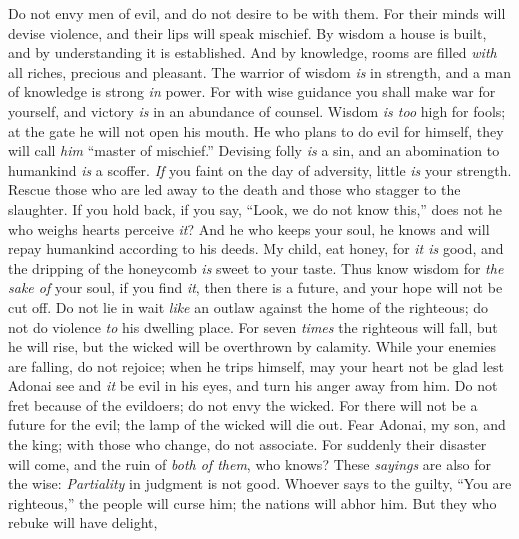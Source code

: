 \begin{biblechapter} %
\verse Do not envy men of evil, 
and do not desire to be with them.
\verse For their minds will devise violence, 
and their lips will speak mischief.
\verse By wisdom a house is built, 
and by understanding it is established.
\verse And by knowledge, rooms are filled 
\textit{with} all riches, precious and pleasant.
\verse The warrior of wisdom \textit{is} in strength, 
and a man of knowledge is strong \textit{in} power.
\verse For with wise guidance you shall make war for yourself, 
and victory \textit{is} in an abundance of counsel.
\verse Wisdom \textit{is too} high for fools; 
at the gate he will not open his mouth.
\verse He who plans to do evil for himself, 
they will call \textit{him} “master of mischief.”
\verse Devising folly \textit{is} a sin, 
and an abomination to humankind \textit{is} a scoffer.
\verse \textit{If} you faint on the day of adversity, 
little \textit{is} your strength.
\verse Rescue those who are led away to the death 
and those who stagger to the slaughter. If you hold back,
\verse if you say, “Look, we do not know this,” 
does not he who weighs hearts perceive \textit{it}? 
And he who keeps your soul, 
he knows and will repay humankind according to his deeds.
\verse My child, eat honey, for \textit{it is} good, 
and the dripping of the honeycomb \textit{is} sweet to your taste.
\verse Thus know wisdom for \textit{the sake of} your soul, 
if you find \textit{it}, then there is a future, 
and your hope will not be cut off.
\verse Do not lie in wait \textit{like} an outlaw against the home of the righteous; 
do not do violence \textit{to} his dwelling place.
\verse For seven \textit{times} the righteous will fall, but he will rise, 
but the wicked will be overthrown by calamity.
\verse While your enemies are falling, do not rejoice; 
when he trips himself, may your heart not be glad
\verse lest Adonai see and \textit{it} be evil in his eyes, 
and turn his anger away from him.
\verse Do not fret because of the evildoers; 
do not envy the wicked.
\verse For there will not be a future for the evil; 
the lamp of the wicked will die out.
\verse Fear Adonai, my son, and the king; 
with those who change, do not associate.
\verse For suddenly their disaster will come, 
and the ruin of \textit{both of them}, who knows?
\verse These \textit{sayings} are also for the wise: 
\textit{Partiality} in judgment is not good.
\verse Whoever says to the guilty, “You are righteous,” the people will curse him; 
the nations will abhor him.
\verse But they who rebuke will have delight, 

\end{biblechapter}
